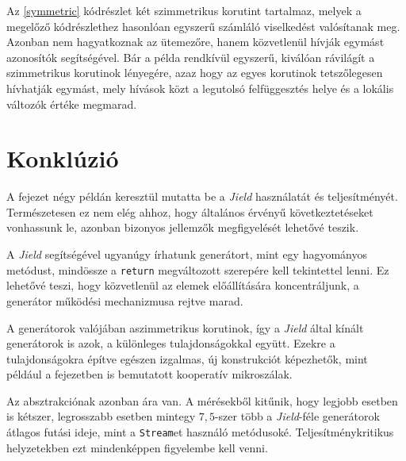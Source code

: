 Az \ref{symmetric} kódrészlet két szimmetrikus korutint tartalmaz, melyek a megelőző kódrészlethez hasonlóan egyszerű számláló viselkedést valósítanak meg. Azonban nem hagyatkoznak az ütemezőre, hanem közvetlenül hívják egymást azonosítók segítségével. Bár a példa rendkívül egyszerű, kiválóan rávilágít a szimmetrikus korutinok lényegére, azaz hogy az egyes korutinok tetszőlegesen hívhatják egymást, mely hívások közt a legutolsó felfüggesztés helye és a lokális változók értéke megmarad. 

\section{Konklúzió}

A fejezet négy példán keresztül mutatta be a \textit{Jield} használatát és teljesítményét. Természetesen ez nem elég ahhoz, hogy általános érvényű következtetéseket vonhassunk le, azonban bizonyos jellemzők megfigyelését lehetővé teszik.

A \textit{Jield} segítségével ugyanúgy írhatunk generátort, mint egy hagyományos metódust, mindössze a \texttt{return} megváltozott szerepére kell tekintettel lenni. Ez lehetővé teszi, hogy közvetlenül az elemek előállítására koncentráljunk, a generátor működési mechanizmusa rejtve marad.

A generátorok valójában aszimmetrikus korutinok, így a \textit{Jield} által kínált generátorok is azok, a különleges tulajdonságokkal együtt. Ezekre a tulajdonságokra építve egészen izgalmas, új konstrukciót képezhetők, mint például a fejezetben is bemutatott kooperatív mikroszálak.

Az absztrakciónak azonban ára van. A mérésekből kitűnik, hogy legjobb esetben is kétszer, legrosszabb esetben mintegy $7,5$-szer több a \textit{Jield}-féle generátorok átlagos futási ideje, mint a \texttt{Stream}et használó metódusoké. Teljesítménykritikus helyzetekben ezt mindenképpen figyelembe kell venni.
